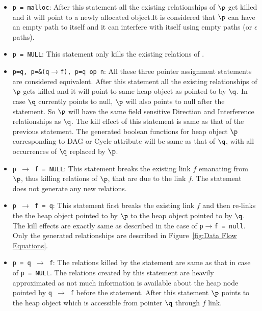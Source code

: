 \begin{itemize}
\item {\tt p = malloc}:
    After this statement all the existing relationships of $\p$ get killed and it will point to a
newly allocated object.It is considered that  $\p$ can have an empty path to itself and it can interfere
with itself using empty paths (or $\epsilon$ paths).

\item {\tt p = NULL}:
   This statement only kills the existing relations of \p.
	
\item{\tt p=q,  p=\&(q$\rightarrow$f),  p=q op n}:
All these three pointer assignment statements are considered equivalent. 
After this statement all the existing relationships of $\p$ gets
killed and it will point to same heap object as pointed to
by $\q$. In case $\q$ currently points to null, $\p$ will also points
to null after the statement. So $\p$ will have the same field
sensitive Direction and Interference relationships as $\q$. 
The kill effect of this statement is same as that of the previous statement. 
The generated boolean functions for heap object $\p$ corresponding 
to DAG or Cycle attribute will be same as that of $\q$, with all occurrences of $\q$ 
replaced by $\p$.
	
\item{\tt p $\rightarrow$ f = NULL}: 
This statement breaks the existing link $f$ emanating from
$\p$, thus killing relations of $\p$, that are due to the link
$f$. The statement does not generate any new relations. 
           
\item{\tt p $\rightarrow$ f = q}:
This statement first breaks
  the existing link $f$ and then re-links the the heap object
  pointed to by $\p$ to the heap object pointed to by
  $\q$. The kill effects are exactly same as described in the
  case of  {\tt p$\rightarrow$f = null}.  Only the
  generated relationships are described in Figure~\ref{fig:Data Flow Equations}. 

\item{\tt p = q $\rightarrow$ f}:
The relations killed by the
  statement are same as that in case of {\tt p = NULL}. The
  relations created by this statement are heavily
  approximated as not much information is available about the heap node pointed by {\tt q $\rightarrow$ f} before the statement.
  After this statement $\p$ points to the heap object which is accessible from pointer
  $\q$ through $f$ link. 

\end{itemize}


